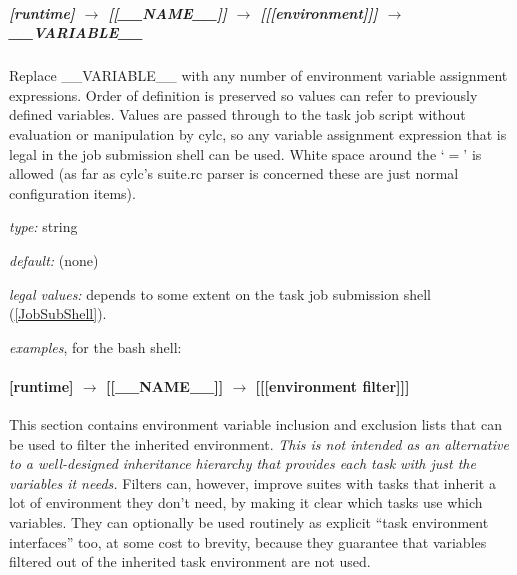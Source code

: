 \subparagraph[\_\_VARIABLE\_\_ ]{[runtime] $\rightarrow$ [[\_\_NAME\_\_]] $\rightarrow$ [[[environment]]] $\rightarrow$ \_\_VARIABLE\_\_}
\label{AppendixTaskExecutionEnvironment}

Replace \_\_VARIABLE\_\_ with any number of environment variable
assignment expressions.
Order of definition is preserved so values can refer to previously
defined variables. Values are passed through to the task job script
without evaluation or manipulation by cylc, so any variable assignment
expression that is legal in the job submission shell can be used.
White space around the `$=$' is allowed (as far as cylc's suite.rc
parser is concerned these are just normal configuration items).

\begin{myitemize}
\item {\em type:} string
\item {\em default:} (none)
\item {\em legal values:} depends to some extent on the task job
    submission shell (\ref{JobSubShell}).
\item {\em examples}, for the bash shell:
\end{myitemize}

\paragraph[{[[[}environment filter{]]]}]{ [runtime] $\rightarrow$ [[\_\_NAME\_\_]] $\rightarrow$ [[[environment filter]]]}
\label{EnvironmentFilter}

This section contains environment variable inclusion and exclusion
lists that can be used to filter the inherited environment. {\em This is
not intended as an alternative to a well-designed inheritance hierarchy
that provides each task with just the variables it needs.} Filters can,
however, improve suites with tasks that inherit a lot of environment
they don't need, by making it clear which tasks use which variables.
They can optionally be used routinely as explicit ``task environment
interfaces'' too, at some cost to brevity, because they guarantee that
variables filtered out of the inherited task environment are not used.

